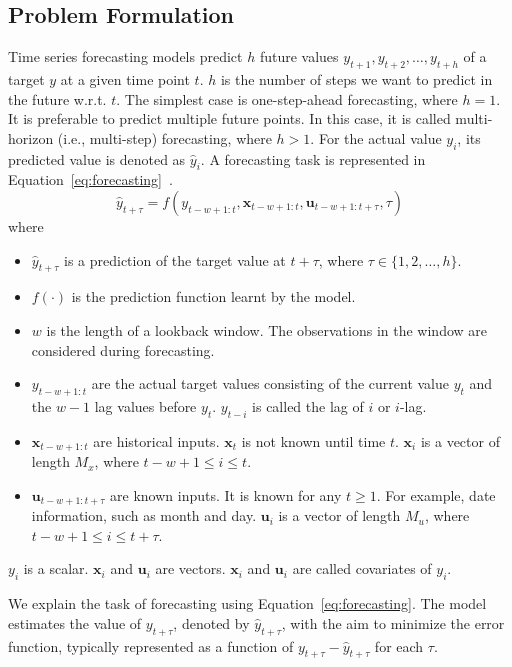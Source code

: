 \subsection{Problem Formulation} %

Time series forecasting models predict $h$ future values $y_{t+1}, y_{t+2}, \dots, y_{t+h}$ of a target $y$ at a given time point $t$.
$h$ is the number of steps we want to predict in the future w.r.t. $t$.
The simplest case is one-step-ahead forecasting, where $h = 1$.
It is preferable to predict multiple future points.
In this case, it is called multi-horizon (i.e., multi-step) forecasting, where $h > 1$.
For the actual value $y_i$, its predicted value is denoted as $\hat{y}_i$.
A forecasting task is represented in Equation~\ref{eq:forecasting}~\cite{lim2021timeseries}.
\begin{equation} 
    \label{eq:forecasting}
    \hat{y}_{t+\tau} = f(y_{t-w+1:t}, \bm{x}_{t-w+1:t}, \bm{u}_{t-w+1:t+\tau}, \tau)
\end{equation}
where
\begin{itemize}
    \item $\hat{y}_{t+\tau}$ is a prediction of the target value at $t+\tau$, where $\tau \in \{ 1, 2, \dots, h\}$.
    \item $f(\cdot)$ is the prediction function learnt by the model.
    \item $w$ is the length of a lookback window. The observations in the window are considered during forecasting.
    \item $y_{t-w+1:t}$ are the actual target values consisting of the current value $y_t$ and the $w-1$ lag values before $y_t$. $y_{t-i}$ is called the lag of $i$ or $i$-lag.
    \item $\bm{x}_{t-w+1:t}$ are historical inputs. $\bm{x}_t$ is not known until time $t$. $\bm{x}_i$ is a vector of length $M_x$, where $t-w+1 \leq i \leq t$.
    \item $\bm{u}_{t-w+1:t+\tau}$ are known inputs. It is known for any $t \geq 1$. For example, date information, such as month and day. $\bm{u}_i$ is a vector of length $M_u$, where $t-w+1 \leq i \leq t+\tau$.
\end{itemize}
$y_i$ is a scalar. $\textbf{x}_i$ and $\textbf{u}_i$ are vectors.
$\textbf{x}_i$ and $\textbf{u}_i$ are called covariates of $y_i$.

We explain the task of forecasting using Equation~\ref{eq:forecasting}.
The model estimates the value of $y_{t+\tau}$, denoted by $\hat{y}_{t+\tau}$, with the aim to minimize the error function, typically represented as a function of $y_{t+\tau} - \hat{y}_{t+\tau}$ for each $\tau$.

